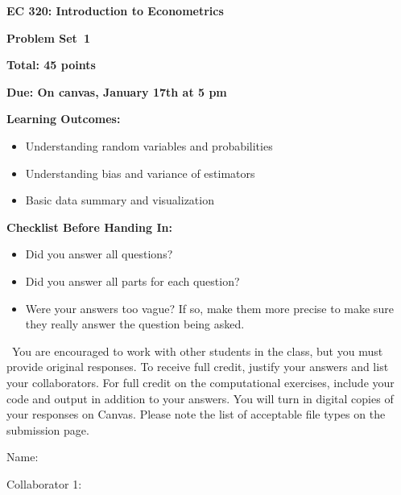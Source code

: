 \documentclass[11pt]{article}
\begin{document}
\begin{onehalfspacing}

\begin{center}
\textbf{EC 320: Introduction to Econometrics} \bigskip

\textbf{Problem Set\bigskip\ 1}
\bigskip
\end{center}


\noindent \textbf{Total:  45 points}

\noindent \textbf{Due: On canvas, January 17th at 5 pm}

\bigskip

\noindent \textbf{Learning Outcomes:}
\begin{itemize}
\item Understanding random variables and probabilities  
\item Understanding bias and variance of estimators 
\item Basic data summary and visualization
\end{itemize}

\bigskip


\noindent \textbf{Checklist Before Handing In:}
\begin{itemize}
\item Did you answer all questions?
\item Did you answer all parts for each question?
\item Were your answers too vague? If so, make them more precise to make sure they really answer the question being asked.
\end{itemize}

\bigskip

\ You are encouraged to work with other students in the class, but you must provide original responses. To receive full credit, justify your answers and list your collaborators. For full credit on the computational exercises, include your code and output in addition to your answers. You will turn in digital copies of your responses on Canvas. Please note the list of acceptable file types on the submission page. \\
\vspace{0.1in}

Name: 			\\
\vspace{0.1in}

Collaborator 1: \\

\vspace{0.1in}


\end{onehalfspacing}
\end{document}

